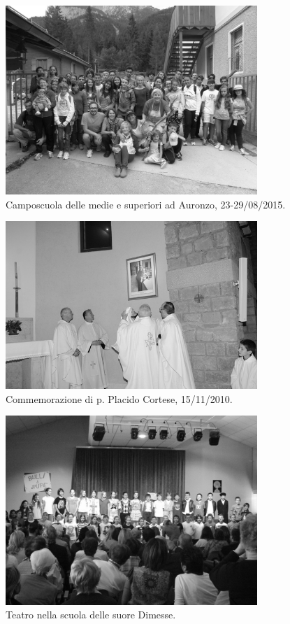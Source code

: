 \begin{figure}
    \captionsetup{labelformat=empty}
    \centering
	  \includegraphics[width=0.85\textwidth]{immagini/camposcuola2015.jpg}
    \caption{ Camposcuola delle medie e superiori ad Auronzo, 23-29/08/2015.}
		\vspace{-15pt}
\end{figure}
\newpage
\begin{figure}
    \captionsetup{labelformat=empty}
    \centering
	  \includegraphics[width=0.85\textwidth]{immagini/CommemorazionePadrePlacido.jpg}
    \caption{Commemorazione di p. Placido Cortese, 15/11/2010.}
		\vspace{-15pt}
\end{figure}
\newpage
\begin{figure}
    \captionsetup{labelformat=empty}
    \centering
	  \includegraphics[width=0.85\textwidth]{immagini/TeatroScuolaDimesse.jpg}
    \caption{Teatro nella scuola delle suore Dimesse.}
		\vspace{-15pt}
\end{figure}
\newpage